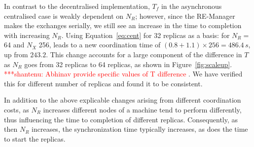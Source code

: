 \documentclass{rspublic}
\newcommand{\jhanote}[1]{ {\textcolor{red} { ***shantenu: #1 }}}
\newcommand{\alnote}[1]{ {\textcolor{blue} { ***andre: #1 }}}
\newcommand{\alnote}[1]{}
\newcommand{\jhanote}[1]{}
\begin{document}


In contrast to the decentralised implementation, $T_f$ in the
asynchronous centralised case is weakly dependent on $N_R$; however,
since the RE-Manager makes the exchanges serially, we still see an
increase in the time to completion with increasing $N_R$. Using
Equation~\ref{eq:cent} for 32 replicas as a basis: for $N_R =$ 64 and
$N_X$ 256, leads to a new coordination time of $(0.8+1.1) \times 256 =
486.4\,s$, up from $243.2$. This change accounts for a large component
of the difference in $T$ as $N_R$ goes from 32 replicas to 64
replicas, as shown in Figure~\ref{fig:scaleup}. \jhanote{Abhinav
  provide specific values of T difference}. We have verified this for
different number of replicas and found it to be consistent.

In addition to the above explicable changes arising from different
coordination costs, as $N_R$ increases different nodes of a machine
tend to perform differently, thus influencing the time to completion
of different replicas.  Consequently, as then $N_R$ increases, the
synchronization time typically increases, as does the time to start
the replicas.

\end{document}
